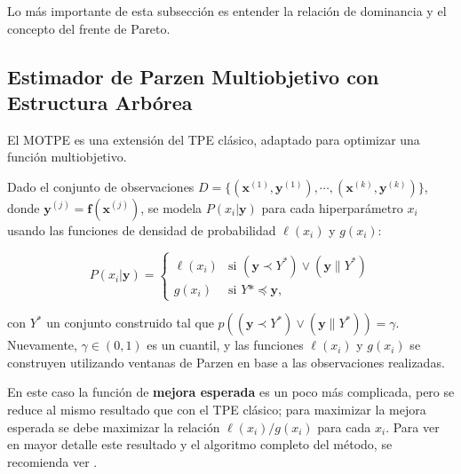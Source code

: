 


Lo más importante de esta subsección es entender la relación de dominancia y el concepto del frente de Pareto.

\subsection{Estimador de Parzen Multiobjetivo con Estructura Arbórea}

El MOTPE es una extensión del TPE clásico, adaptado para optimizar una función multiobjetivo.

Dado el conjunto de observaciones $D = \{(\textbf{x}^{(1)},\textbf{y}^{(1)}), \cdots, (\textbf{x}^{(k)},\textbf{y}^{(k)}) \}$, donde $\textbf{y}^{(j)} = \textbf{f}(\textbf{x}^{(j)})$, se modela $P(x_i|\textbf{y})$ para cada hiperparámetro $x_i$ usando las funciones de densidad de probabilidad $\ell(x_i)$ y $g(x_i)$:


\begin{equation}
\label{eq:motpe}
P(x_i|\textbf{y}) =
	\begin{cases}
		\ell (x_i) & \text{si } (\textbf{y} \prec Y^*) \vee (\textbf{y} \| Y^*) \\
		g(x_i) & \text{si } Y* \preceq \textbf{y},
	\end{cases}
\end{equation}

con $Y^*$ un conjunto construido tal que $p((\textbf{y} \prec Y^*) \vee (\textbf{y} \| Y^*)) = \gamma$. Nuevamente, $\gamma \in (0,1)$ es un cuantil, y las funciones $\ell(x_i)$ y $g(x_i)$ se construyen utilizando ventanas de Parzen en base a las observaciones realizadas.

En este caso la función de \textbf{mejora esperada} es un poco más complicada, pero se reduce al mismo resultado que con el TPE clásico; para maximizar la mejora esperada se debe maximizar la relación $\ell(x_i)/g(x_i)$ para cada $x_i$. Para ver en mayor detalle este resultado y el algoritmo completo del método, se recomienda ver \cite{10.1613/jair.1.13188}.





